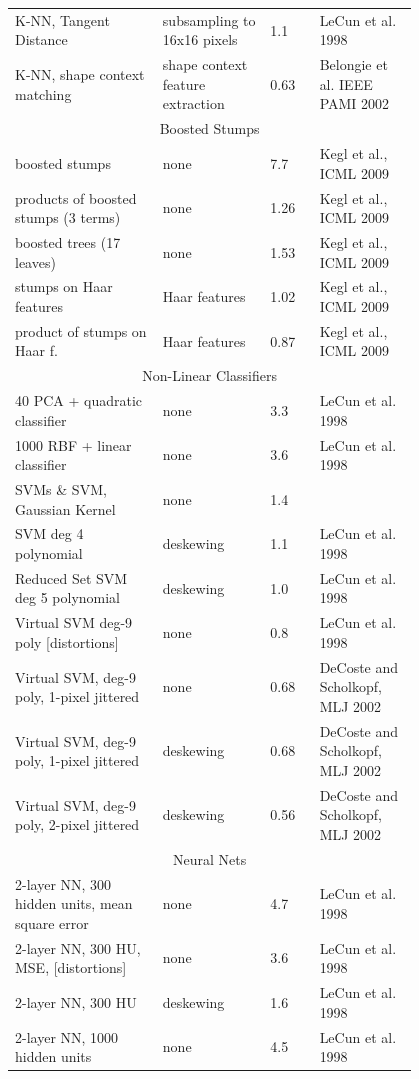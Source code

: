 \documentclass[utf8,usehyperref,14pt]{G7-32}
\begin{document}
\begin{longtable}{p{0.3\linewidth}|p{0.2\linewidth}|p{0.1\linewidth}|p{0.2\linewidth}}
K-NN, Tangent Distance & subsampling to 16x16 pixels & 1.1 & LeCun et al. 1998  \\ 
K-NN, shape context matching & shape context feature extraction & 0.63 & Belongie et al. IEEE PAMI 2002  \\ 
\multicolumn{4}{c}{Boosted Stumps} \\ \hline
boosted stumps & none & 7.7 & Kegl et al., ICML 2009 \\ 
products of boosted stumps (3 terms) & none & 1.26 & Kegl et al., ICML 2009  \\ 
boosted trees (17 leaves) & none & 1.53 & Kegl et al., ICML 2009  \\ 
stumps on Haar features & Haar features & 1.02 & Kegl et al., ICML 2009  \\ 
product of stumps on Haar f. & Haar features & 0.87 & Kegl et al., ICML 2009 \\ 
\multicolumn{4}{c}{Non-Linear Classifiers} \\ \hline
40 PCA + quadratic classifier & none & 3.3 & LeCun et al. 1998  \\ 
1000 RBF + linear classifier & none & 3.6 & LeCun et al. 1998  \\ 
SVMs \& SVM, Gaussian Kernel & none & 1.4 &  \\ 
SVM deg 4 polynomial & deskewing & 1.1 & LeCun et al. 1998  \\ 
Reduced Set SVM deg 5 polynomial & deskewing & 1.0 & LeCun et al. 1998  \\ 
Virtual SVM deg-9 poly [distortions] & none & 0.8 & LeCun et al. 1998  \\ 
Virtual SVM, deg-9 poly, 1-pixel jittered & none & 0.68 & DeCoste and Scholkopf, MLJ 2002  \\ 
Virtual SVM, deg-9 poly, 1-pixel jittered & deskewing & 0.68 & DeCoste and Scholkopf, MLJ 2002  \\ 
Virtual SVM, deg-9 poly, 2-pixel jittered & deskewing & 0.56 & DeCoste and Scholkopf, MLJ 2002  \\ 
\multicolumn{4}{c}{Neural Nets} \\ \hline
2-layer NN, 300 hidden units, mean square error & none & 4.7 & LeCun et al. 1998  \\ 
2-layer NN, 300 HU, MSE, [distortions] & none & 3.6 & LeCun et al. 1998  \\ 
2-layer NN, 300 HU & deskewing & 1.6 & LeCun et al. 1998  \\ 
2-layer NN, 1000 hidden units & none & 4.5 & LeCun et al. 1998  \\ 

\end{longtable}
\end{document}
